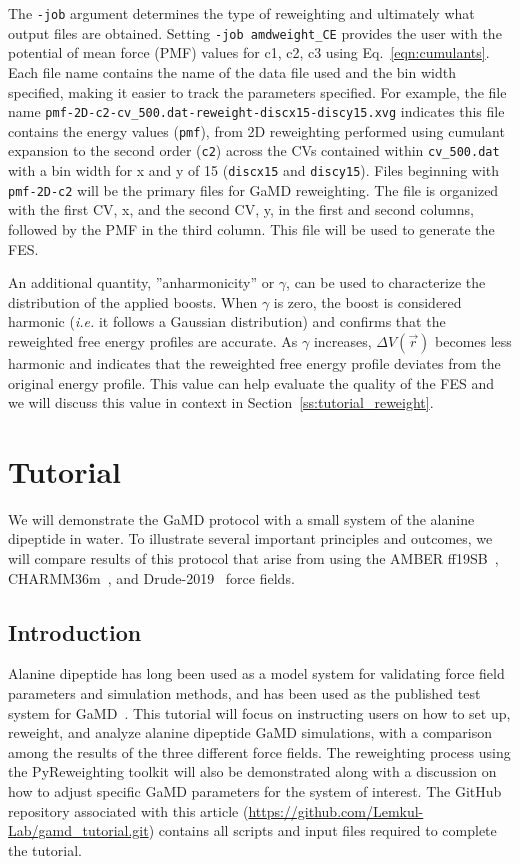 \documentclass[9pt,tutorial]{livecoms}
\newcommand{\githubrepository}{\url{https://github.com/Lemkul-Lab/gamd_tutorial.git}}  %
\begin{document}
The \texttt{-job} argument determines the type of reweighting and ultimately what output files are obtained. Setting \texttt{-job amdweight\_CE} provides the user with the potential of mean force (PMF) values for c1, c2, c3 using Eq.~\ref{eqn:cumulants}. Each file name contains the name of the data file used and the bin width specified, making it easier to track the parameters specified. For example, the file name \texttt{pmf-2D-c2-cv\_500.dat-reweight-discx15-discy15.xvg} indicates this file contains the energy values (\texttt{pmf}), from 2D reweighting performed using cumulant expansion to the second order (\texttt{c2}) across the CVs contained within \texttt{cv\_500.dat} with a bin width for x and y of 15 (\texttt{discx15} and \texttt{discy15}). Files beginning with \texttt{pmf-2D-c2} will be the primary files for GaMD reweighting. The file is organized with the first CV, x, and the second CV, y, in the first and second columns, followed by the PMF in the third column. This file will be used to generate the FES.

An additional quantity, ''anharmonicity'' or $\gamma$, can be used to characterize the distribution of the applied boosts. When $\gamma$ is zero, the boost is considered harmonic (\textit{i.e.} it follows a Gaussian distribution) and confirms that the reweighted free energy profiles are accurate. As $\gamma$ increases, $\Delta{V(\vec{r})}$ becomes less harmonic and indicates that the reweighted free energy profile deviates from the original energy profile. This value can help evaluate the quality of the FES and we will discuss this value in context in Section~\ref{ss:tutorial_reweight}.

\section{Tutorial} 
\label{sec:tutorial}
We will demonstrate the GaMD protocol with a small system of the alanine dipeptide in water. To illustrate several important principles and outcomes, we will compare results of this protocol that arise from using the AMBER ff19SB~\cite{tian_ff19sb_2020}, CHARMM36m~\cite{huang_charmm36m_2017}, and Drude-2019~\cite{lin_further_2020} force fields. 

\subsection{Introduction}
Alanine dipeptide has long been used as a model system for validating force field parameters and simulation methods, and has been used as the published test system for GaMD~\cite{miao_gaussian_2015, pang_gaussian_2017, copeland_gaussian_2022}. This tutorial will focus on instructing users on how to set up, reweight, and analyze alanine dipeptide GaMD simulations, with a comparison among the results of the three different force fields. The reweighting process using the PyReweighting toolkit will also be demonstrated along with a discussion on how to adjust specific GaMD parameters for the system of interest. The GitHub repository associated with this article (\githubrepository) contains all scripts and input files required to complete the tutorial.
\end{document}
